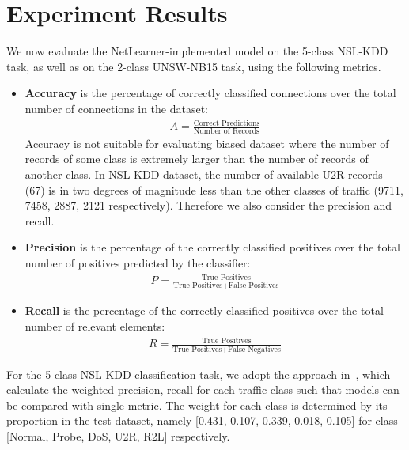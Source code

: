 \section{Experiment Results}

We now evaluate the NetLearner-implemented model on the 5-class NSL-KDD task,
as well as on the 2-class UNSW-NB15 task, using the following metrics.
\begin{itemize}
    \item \textbf{Accuracy} is the percentage of correctly classified connections
        over the total number of connections in the dataset:
        \begin{align}
            A = \frac{\text{Correct Predictions}}{\text{Number of Records}}
        \end{align} 
        Accuracy is not suitable for evaluating biased dataset where the number
        of records of some class is extremely larger than the number of
        records of another class.
        In NSL-KDD dataset, the number of available U2R records (67)
        is in two degrees of magnitude less than the other classes of traffic
        (9711, 7458, 2887, 2121 respectively).
        Therefore we also consider the precision and recall.
    \item \textbf{Precision} is the percentage of the correctly classified positives over
        the total number of positives predicted by the classifier:
                \begin{align}
                    P = \frac{\text{True Positives}}{\text{True Positives} + \text{False Positives}}
                \end{align}
    \item \textbf{Recall} is the percentage of the correctly classified positives over
        the total number of relevant elements:
                \begin{align}
                    R = \frac{\text{True Positives}}{\text{True Positives} + \text{False Negatives}}
                \end{align}
\end{itemize}
For the 5-class NSL-KDD classification task, we adopt the approach in~\cite{STL-NIDS},
which calculate the weighted precision, recall for each traffic class such that models
can be compared with single metric.
The weight for each class is determined by its proportion in the test dataset,
namely [0.431, 0.107, 0.339, 0.018, 0.105] for class [Normal, Probe, DoS, U2R, R2L] respectively.


